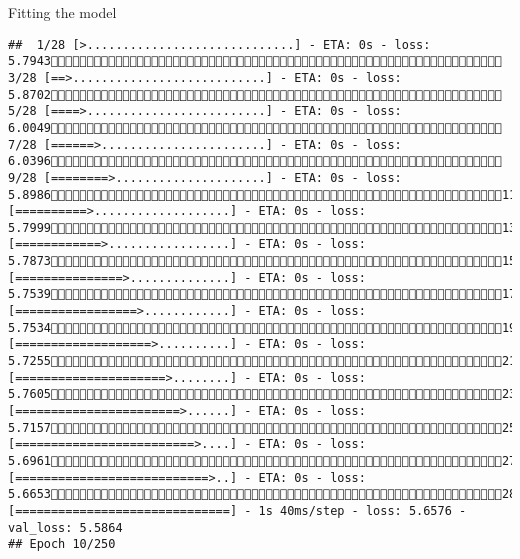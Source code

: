 \documentclass[
  ignorenonframetext,
]{beamer}
\begin{document}
\begin{frame}[fragile]{Fitting the model}
\begin{verbatim}
##  1/28 [>.............................] - ETA: 0s - loss: 5.7943 3/28 [==>...........................] - ETA: 0s - loss: 5.8702 5/28 [====>.........................] - ETA: 0s - loss: 6.0049 7/28 [======>.......................] - ETA: 0s - loss: 6.0396 9/28 [========>.....................] - ETA: 0s - loss: 5.898611/28 [==========>...................] - ETA: 0s - loss: 5.799913/28 [============>.................] - ETA: 0s - loss: 5.787315/28 [===============>..............] - ETA: 0s - loss: 5.753917/28 [=================>............] - ETA: 0s - loss: 5.753419/28 [===================>..........] - ETA: 0s - loss: 5.725521/28 [=====================>........] - ETA: 0s - loss: 5.760523/28 [=======================>......] - ETA: 0s - loss: 5.715725/28 [=========================>....] - ETA: 0s - loss: 5.696127/28 [===========================>..] - ETA: 0s - loss: 5.665328/28 [==============================] - 1s 40ms/step - loss: 5.6576 - val_loss: 5.5864
## Epoch 10/250

\end{verbatim}
\end{frame}
\end{document}
